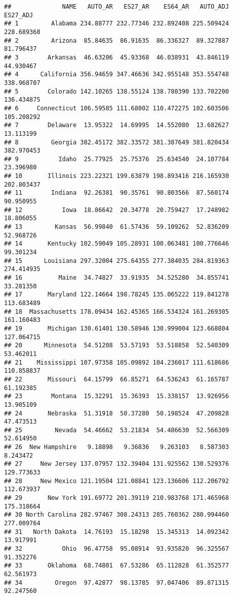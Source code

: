 \documentclass[
]{article}
\begin{document}
\begin{verbatim}
##              NAME   AUTO_AR   ES27_AR    ES64_AR   AUTO_ADJ   ES27_ADJ
## 1         Alabama 234.88777 232.77346 232.892408 225.509424 228.689368
## 2         Arizona  85.84635  86.91635  86.336327  89.327887  81.796437
## 3        Arkansas  46.63206  45.93368  46.038931  43.846119  44.930467
## 4      California 356.94659 347.46636 342.955148 353.554748 338.968707
## 5        Colorado 142.10265 138.55124 138.780390 133.702200 136.434875
## 6     Connecticut 106.59585 111.68002 110.472275 102.603506 105.208292
## 7        Delaware  13.95322  14.69995  14.552080  13.682627  13.113199
## 8         Georgia 382.45172 382.33572 381.387649 381.820434 382.970453
## 9           Idaho  25.77925  25.75376  25.634540  24.107784  23.396980
## 10       Illinois 223.22321 199.63879 198.893416 216.165930 202.803437
## 11        Indiana  92.26381  90.35761  90.803566  87.560174  90.950955
## 12           Iowa  18.86642  20.34778  20.759427  17.248982  18.806055
## 13         Kansas  56.99840  61.57436  59.109262  52.836209  52.968726
## 14       Kentucky 102.59049 105.28931 100.063481 100.776646  99.301234
## 15      Louisiana 297.32004 275.64355 277.384035 284.819363 274.414935
## 16          Maine  34.74827  33.91935  34.525280  34.855741  33.281350
## 17       Maryland 122.14664 198.78245 135.065222 119.841278 113.683489
## 18  Massachusetts 178.09434 162.45365 166.534324 161.269305 161.160483
## 19       Michigan 130.61401 130.58946 130.999004 123.668804 127.064715
## 20      Minnesota  54.51208  53.57193  53.518858  52.540309  53.462011
## 21    Mississippi 107.97358 105.09892 104.236017 111.618686 110.858837
## 22       Missouri  64.15799  66.85271  64.536243  61.165787  61.192385
## 23        Montana  15.32291  15.36393  15.338157  13.926956  13.905109
## 24       Nebraska  51.31918  50.37280  50.198524  47.209828  47.473513
## 25         Nevada  54.46662  53.21834  54.486630  52.566309  52.614950
## 26  New Hampshire   9.18898   9.36836   9.263103   8.587303   8.243472
## 27     New Jersey 137.07957 132.39404 131.925562 130.529376 129.773633
## 28     New Mexico 121.19504 121.08841 123.136606 112.206792 112.673937
## 29       New York 191.69772 201.39119 210.983768 171.465968 175.318664
## 30 North Carolina 282.97467 308.24313 285.760362 280.994460 277.009764
## 31   North Dakota  14.76193  15.18298  15.345313  14.092342  13.917991
## 32           Ohio  96.47758  95.08914  93.935820  96.325567  91.352276
## 33       Oklahoma  68.74801  67.53286  65.112828  61.352577  62.561973
## 34         Oregon  97.42877  98.13785  97.047406  89.871315  92.247560

\end{verbatim}
\end{document}

